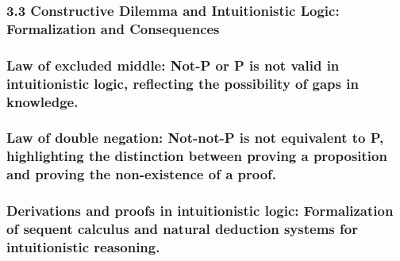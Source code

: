 \hypertarget{constructive-dilemma-and-intuitionistic-logic-formalization-and-consequences}{%
\subsubsection*{\texorpdfstring{\textbf{3.3 Constructive Dilemma and
Intuitionistic Logic: Formalization and
Consequences}}{3.3 Constructive Dilemma and Intuitionistic Logic: Formalization and Consequences}}\label{constructive-dilemma-and-intuitionistic-logic-formalization-and-consequences}}

\hypertarget{law-of-excluded-middle-not-p-or-p-is-not-valid-in-intuitionistic-logic-reflecting-the-possibility-of-gaps-in-knowledge.}{%
\subsubsection{Law of excluded middle: Not-P or P is not valid in
intuitionistic logic, reflecting the possibility of gaps in
knowledge.}\label{law-of-excluded-middle-not-p-or-p-is-not-valid-in-intuitionistic-logic-reflecting-the-possibility-of-gaps-in-knowledge.}}

\hypertarget{law-of-double-negation-not-not-p-is-not-equivalent-to-p-highlighting-the-distinction-between-proving-a-proposition-and-proving-the-non-existence-of-a-proof.}{%
\subsubsection{Law of double negation: Not-not-P is not equivalent to P,
highlighting the distinction between proving a proposition and proving
the non-existence of a
proof.}\label{law-of-double-negation-not-not-p-is-not-equivalent-to-p-highlighting-the-distinction-between-proving-a-proposition-and-proving-the-non-existence-of-a-proof.}}

\hypertarget{derivations-and-proofs-in-intuitionistic-logic-formalization-of-sequent-calculus-and-natural-deduction-systems-for-intuitionistic-reasoning.}{%
\subsubsection{Derivations and proofs in intuitionistic logic:
Formalization of sequent calculus and natural deduction systems for
intuitionistic
reasoning.}\label{derivations-and-proofs-in-intuitionistic-logic-formalization-of-sequent-calculus-and-natural-deduction-systems-for-intuitionistic-reasoning.}}

